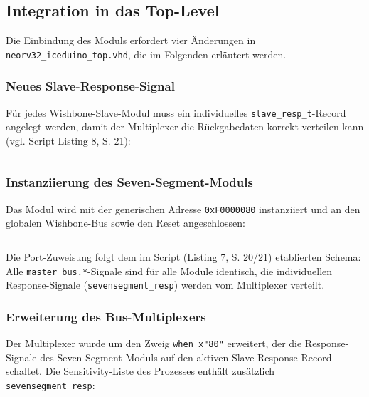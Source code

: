 \subsection{Integration in das Top-Level}

Die Einbindung des Moduls erfordert vier Änderungen in \texttt{neorv32\_iceduino\_top.vhd}, die im Folgenden erläutert werden.

\subsubsection{Neues Slave-Response-Signal}

Für jedes Wishbone-Slave-Modul muss ein individuelles \texttt{slave\_resp\_t}-Record angelegt werden, damit der Multiplexer die Rückgabedaten korrekt verteilen kann (vgl. Script Listing 8, S. 21):

\inputminted[linenos,frame=single,fontsize=\footnotesize,firstline=140,lastline=142]{vhdl}{A6_Abgabe/iceduino_setup/osflow/boards/iceduino/neorv32_iceduino_top.vhd}

\subsubsection{Instanziierung des Seven-Segment-Moduls}

Das Modul wird mit der generischen Adresse \texttt{0xF0000080} instanziiert und an den globalen Wishbone-Bus sowie den Reset angeschlossen:

\inputminted[linenos,frame=single,fontsize=\footnotesize,firstline=436,lastline=455]{vhdl}{A6_Abgabe/iceduino_setup/osflow/boards/iceduino/neorv32_iceduino_top.vhd}

Die Port-Zuweisung folgt dem im Script (Listing 7, S. 20/21) etablierten Schema: Alle \texttt{master\_bus.*}-Signale sind für alle Module identisch, die individuellen Response-Signale (\texttt{sevensegment\_resp}) werden vom Multiplexer verteilt.

\subsubsection{Erweiterung des Bus-Multiplexers}

Der Multiplexer wurde um den Zweig \texttt{when x"80"} erweitert, der die Response-Signale des Seven-Segment-Moduls auf den aktiven Slave-Response-Record schaltet. Die Sensitivity-Liste des Prozesses enthält zusätzlich \texttt{sevensegment\_resp}:

